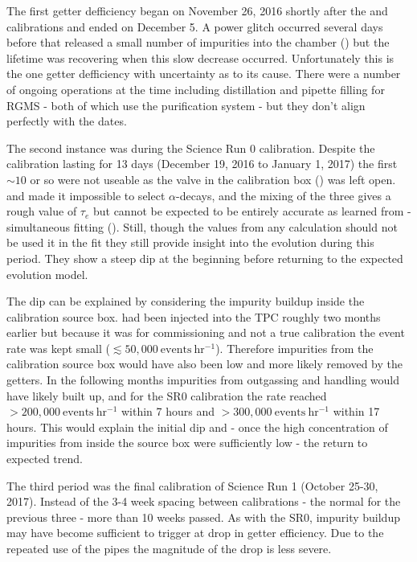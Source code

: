 {The first getter defficiency
began on November 26, 2016 shortly after the \ambe and \metakr calibrations and ended on December 5.  A power glitch occurred several
days before that released a small number of impurities into the chamber
() but the lifetime was recovering when this slow decrease
occurred.  Unfortunately this is the one getter defficiency with uncertainty as to its cause.  There were a number of ongoing operations
at the time including  distillation and pipette filling for RGMS - both of which use the purification system - but they don't
align perfectly with the dates.

The second instance was during the Science Run 0 \rncal calibration.  Despite the calibration lasting for 13 days (December 19, 2016 to
January 1, 2017) the first ${\sim} 10$ or
so were not useable as the valve in the calibration box () was left
open.  \rncal and  made it impossible to select  $\alpha$-decays, and the mixing of the three gives a rough
value of $\tau_e$ but cannot be expected to be entirely accurate as learned from \rnbkg- simultaneous fitting
().  Still, though the values from any calculation should not be used it in the
fit they still provide insight into the evolution during this period.  They show a steep dip at the beginning before returning to the
expected evolution model.

The dip can be explained by considering the impurity buildup inside the calibration source box.  \rncal had been injected into the TPC
roughly two months earlier but because it was for commissioning and not a true calibration the event rate was kept small
($\lesssim 50,000\ \mathrm{events\ hr^{-1}}$).  Therefore
impurities from the calibration source box would have also been low and more likely removed by the getters.  In the following months
impurities from outgassing and handling would have likely built up, and for the SR0 calibration the rate reached
$> 200,000\ \mathrm{events\ hr^{-1}}$ within 7 hours and $> 300,000\ \mathrm{events\ hr^{-1}}$ within 17 hours.  This would explain the
initial dip and - once the high concentration of impurities from inside the source box were sufficiently low - the return to expected
trend.

The third period was the final \rncal calibration of Science Run 1 (October 25-30, 2017).  Instead of the 3-4 week spacing between
calibrations - the normal for the previous three - more than 10 weeks passed.  As with the SR0, impurity buildup may have become
sufficient to trigger at drop in getter efficiency.  Due to the repeated use of the pipes the magnitude of the drop is less severe.

}
